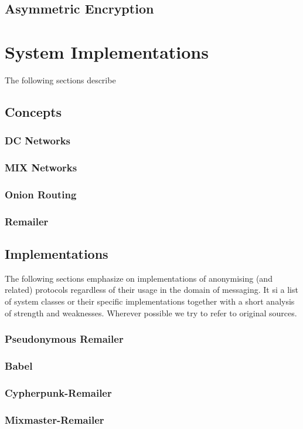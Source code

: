 \subsection{Asymmetric Encryption}

\section{System Implementations}
The following sections describe 
\subsection{Concepts}
\subsubsection{DC Networks}
\subsubsection{MIX Networks}
\subsubsection{Onion Routing}
\subsubsection{Remailer}

\subsection{Implementations}
The following sections emphasize on implementations of anonymising (and related) protocols regardless of their usage in the domain of messaging. It si a list of system classes or their specific implementations together with a short analysis of strength and weaknesses. Wherever possible we try to refer to original sources.
\subsubsection{Pseudonymous Remailer}
\subsubsection{Babel}
\subsubsection{Cypherpunk-Remailer}
\subsubsection{Mixmaster-Remailer}
